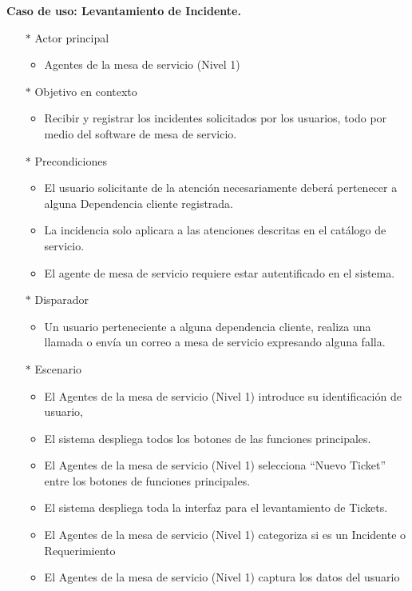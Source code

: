 \begin{multicols}{2}
\textbf{Caso de uso: Levantamiento de Incidente.}

\begin{itemize}
	\item[$*$]  Actor principal
	\begin{itemize}
		\item Agentes de la mesa de servicio (Nivel 1)
	\end{itemize}
	\item[$*$]  Objetivo en contexto
		\begin{itemize}
		\item Recibir y registrar los incidentes solicitados por los usuarios, todo por medio del software de mesa de servicio.
	\end{itemize}
	\item[$*$]  Precondiciones
\begin{itemize}
	\item El usuario solicitante de la atención necesariamente deberá pertenecer a alguna Dependencia cliente registrada. 
	\item La incidencia solo aplicara a las atenciones descritas en el catálogo de servicio.
	\item El agente de mesa de servicio requiere estar autentificado en el sistema.
\end{itemize}	
	\item[$*$]  Disparador
\begin{itemize}
	\item Un usuario perteneciente a alguna dependencia cliente, realiza una llamada o envía un correo a mesa de servicio expresando alguna falla. 
\end{itemize}
	\item[$*$]  Escenario
	\begin{itemize}
		\item El Agentes de la mesa de servicio (Nivel 1) introduce su identificación de usuario,
		\item El sistema despliega todos los botones de las funciones principales.
		\item El Agentes de la mesa de servicio (Nivel 1) selecciona “Nuevo Ticket” entre los botones de funciones principales.
		\item El sistema despliega toda la interfaz para el levantamiento de Tickets.
		\item El Agentes de la mesa de servicio (Nivel 1) categoriza si es un Incidente o Requerimiento 
		\item El Agentes de la mesa de servicio (Nivel 1) captura los datos del usuario 

\end{itemize}
\end{itemize}
\end{multicols}
